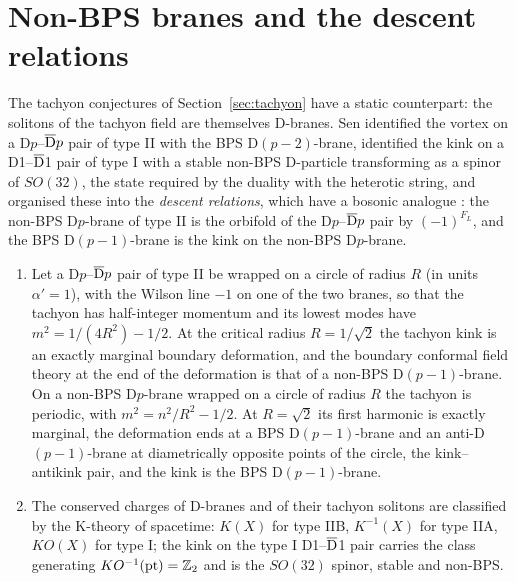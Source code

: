 \section{Non-BPS branes and the descent relations}\label{sec:nonbps}

The tachyon conjectures of Section~\ref{sec:tachyon} have a static counterpart: the solitons of the tachyon field are themselves D-branes. Sen \cite{Sen98bab} identified the vortex on a D$p$--$\overline{\rm D}p$ pair of type II with the BPS D$(p-2)$-brane, \cite{Sen98spinor} identified the kink on a D1--$\overline{\rm D}$1 pair of type I with a stable non-BPS D-particle transforming as a spinor of $SO(32)$, the state required by the duality with the heterotic string, and \cite{Sen98cycles,Sen99nonBPS} organised these into the \emph{descent relations}, which have a bosonic analogue \cite{Sen99descent}: the non-BPS D$p$-brane of type II is the orbifold of the D$p$--$\overline{\rm D}p$ pair by $(-1)^{F_L}$, and the BPS D$(p-1)$-brane is the kink on the non-BPS D$p$-brane.

\begin{theorem}[claims 19, 20]\label{thm:descent}
\begin{enumerate}[label=(\roman*),leftmargin=2em]
\item Let a D$p$--$\overline{\rm D}p$ pair of type II be wrapped on a circle of radius $R$ (in units $\alpha'=1$), with the Wilson line $-1$ on one of the two branes, so that the tachyon has half-integer momentum and its lowest modes have $m^2=1/(4R^2)-1/2$. At the critical radius $R=1/\sqrt2$ the tachyon kink is an exactly marginal boundary deformation, and the boundary conformal field theory at the end of the deformation is that of a non-BPS D$(p-1)$-brane. On a non-BPS D$p$-brane wrapped on a circle of radius $R$ the tachyon is periodic, with $m^2=n^2/R^2-1/2$. At $R=\sqrt2$ its first harmonic is exactly marginal, the deformation ends at a BPS D$(p-1)$-brane and an anti-D$(p-1)$-brane at diametrically opposite points of the circle, the kink--antikink pair, and the kink is the BPS D$(p-1)$-brane.
\item The conserved charges of D-branes and of their tachyon solitons are classified by the K-theory of spacetime: $K(X)$ for type IIB, $K^{-1}(X)$ for type IIA, $KO(X)$ for type I; the kink on the type I D1--$\overline{\rm D}$1 pair carries the class generating $KO^{-1}({\rm pt}) = \mathbb{Z}_2$ and is the $SO(32)$ spinor, stable and non-BPS.
\end{enumerate}
\end{theorem}

